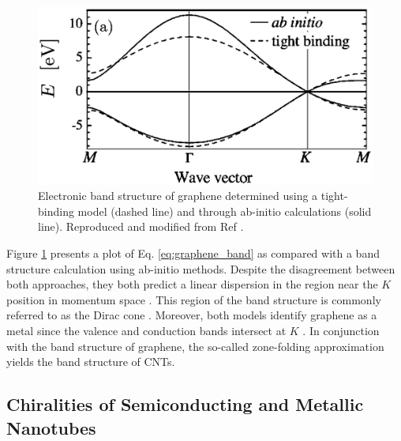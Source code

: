 \begin{figure}[h]
	\centering
	\includegraphics[scale=0.5]{images/chapter_optical_props/graphene_band_charlier}
	\caption{Electronic band structure of graphene determined using a tight-binding model (dashed line) and through ab-initio calculations (solid line). Reproduced and modified from Ref \cite{reich2002tight}.}
	\label{fig:graphene_band}
\end{figure}

Figure \ref{fig:graphene_band} presents a plot of Eq. \ref{eq:graphene_band} as compared with a band structure calculation using ab-initio methods. Despite the disagreement between both approaches, they both predict a linear dispersion in the region near the $K$ position in momentum space \cite{charlier2007electronic}. This region of the band structure is commonly referred to as the Dirac cone	\cite{charlier2007electronic}. Moreover, both models identify graphene as a metal since the valence and conduction bands intersect at $K$ \cite{charlier2007electronic}. In conjunction with the band structure of graphene, the so-called zone-folding approximation yields the band structure of CNTs. 



\subsection{Chiralities of Semiconducting and Metallic Nanotubes}

